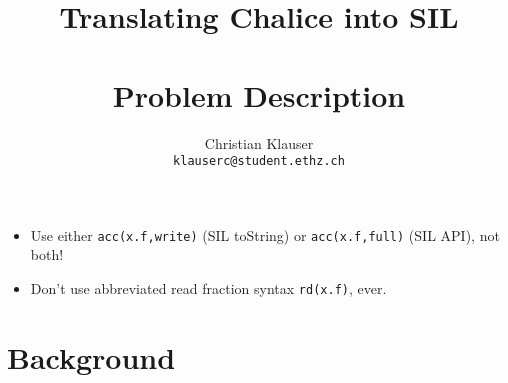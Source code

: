 \documentclass[11pt,a4paper]{article} %
\title{{\Huge Translating Chalice into SIL}\\{\small\ }\\{\huge Problem Description}}
\author{Christian Klauser\\ \texttt{klauserc@student.ethz.ch}}
\newenvironment{sketch}{\begin{mdframed}[backgroundcolor=Salmon,hidealllines=true]}{\end{mdframed}}
\begin{document}
\maketitle

\begin{sketch}
\begin{itemize}
\item Use either \lstinline!acc(x.f,write)! (SIL toString) or \lstinline!acc(x.f,full)! (SIL API), not both!
\item Don't use abbreviated read fraction syntax \lstinline!rd(x.f)!, ever.
\end{itemize}
\end{sketch}



\section{Background}
	
	






\end{document}
